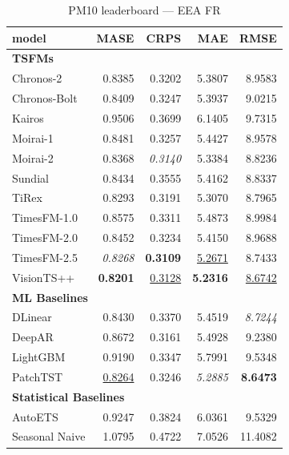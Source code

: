 \begin{table}[H]
\caption{PM10 leaderboard --- EEA FR}
\centering
\begin{small}
\begin{tabular}{lrrrr}
\toprule
model & MASE & CRPS & MAE & RMSE \\
\midrule
\multicolumn{5}{l}{\textbf{TSFMs}} \\
Chronos-2 & 0.8385 & 0.3202 & 5.3807 & 8.9583 \\
Chronos-Bolt & 0.8409 & 0.3247 & 5.3937 & 9.0215 \\
Kairos & 0.9506 & 0.3699 & 6.1405 & 9.7315 \\
Moirai-1 & 0.8481 & 0.3257 & 5.4427 & 8.9578 \\
Moirai-2 & 0.8368 & \textit{0.3140} & 5.3384 & 8.8236 \\
Sundial & 0.8434 & 0.3555 & 5.4162 & 8.8337 \\
TiRex & 0.8293 & 0.3191 & 5.3070 & 8.7965 \\
TimesFM-1.0 & 0.8575 & 0.3311 & 5.4873 & 8.9984 \\
TimesFM-2.0 & 0.8452 & 0.3234 & 5.4150 & 8.9688 \\
TimesFM-2.5 & \textit{0.8268} & \textbf{0.3109} & \underline{5.2671} & 8.7433 \\
VisionTS++ & \textbf{0.8201} & \underline{0.3128} & \textbf{5.2316} & \underline{8.6742} \\
\midrule
\multicolumn{5}{l}{\textbf{ML Baselines}} \\
DLinear & 0.8430 & 0.3370 & 5.4519 & \textit{8.7244} \\
DeepAR & 0.8672 & 0.3161 & 5.4928 & 9.2380 \\
LightGBM & 0.9190 & 0.3347 & 5.7991 & 9.5348 \\
PatchTST & \underline{0.8264} & 0.3246 & \textit{5.2885} & \textbf{8.6473} \\
\midrule
\multicolumn{5}{l}{\textbf{Statistical Baselines}} \\
AutoETS & 0.9247 & 0.3824 & 6.0361 & 9.5329 \\
Seasonal Naive & 1.0795 & 0.4722 & 7.0526 & 11.4082 \\
\bottomrule
\end{tabular}
\end{small}
\end{table}